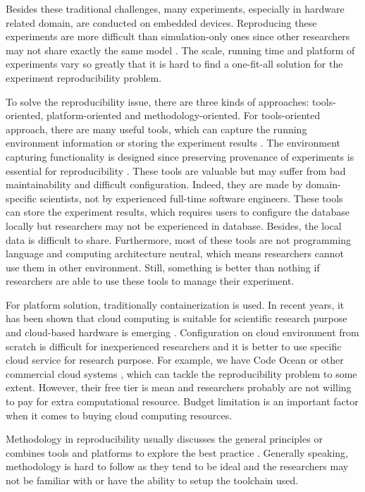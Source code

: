 \documentclass[10pt, conference, compsocconf]{IEEEtran}
\begin{document}
Besides these traditional challenges, many experiments, especially in hardware related domain, are conducted on
embedded devices. Reproducing these experiments are more difficult than simulation-only ones since other researchers may not share exactly the same model \cite{report2017}. The scale, running time and platform of experiments vary so greatly that it is hard to find a
one-fit-all solution for the experiment reproducibility problem.

To solve the reproducibility issue, there are three kinds of approaches: tools-oriented, platform-oriented and methodology-oriented. For tools-oriented approach, there are many useful tools, which can capture the running environment information or storing the experiment results \cite{greff2017sacred}. The environment
capturing functionality is designed since preserving provenance of experiments is essential for reproducibility \cite{freire2018provenance}.
These tools are valuable but may suffer from bad maintainability and difficult configuration.
Indeed, they are made by domain-specific scientists, not by experienced full-time software engineers. These tools can store the experiment results, which requires users to configure the database locally but researchers may not be experienced in database. Besides, the local data is difficult to share. Furthermore, most of these tools are not programming language and computing architecture neutral, which means researchers cannot use them in other environment. Still, something is better than nothing if researchers are able to use these tools to manage their experiment.

For platform solution, traditionally containerization is used. In recent years, it has been shown that cloud computing is suitable for scientific research purpose \cite{Howe12} and cloud-based hardware is emerging \cite{cloudhard}. Configuration on cloud environment from scratch is difficult for inexperienced researchers and it is better to use specific cloud service for research purpose. For example, we have Code Ocean or other commercial cloud systems \cite{perkel2018data}, which can tackle the reproducibility problem to some extent. However, their free tier is mean and researchers probably are not willing to pay for extra computational resource. Budget limitation is an important factor when it comes to buying cloud computing resources.

Methodology in reproducibility usually discusses the general principles \cite{stodden2014best} or combines tools and platforms to explore the best practice \cite{QashaCW16}. Generally speaking, methodology is hard to follow as they tend to be ideal and the researchers may not be familiar with or have the ability to setup the toolchain used.  
\end{document}
